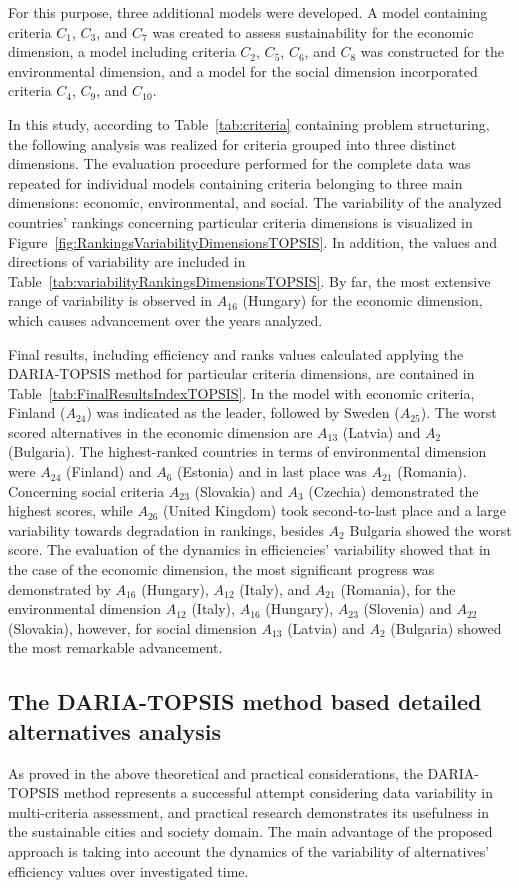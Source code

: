 \documentclass[5p,times]{elsarticle}
\begin{document}
For this purpose, three additional models were developed. A model containing criteria $C_{1}$, $C_{3}$, and $C_{7}$ was created to assess sustainability for the economic dimension, a model including criteria $C_{2}$, $C_{5}$, $C_{6}$, and $C_{8}$ was constructed for the environmental dimension, and a model for the social dimension incorporated criteria $C_{4}$, $C_{9}$, and $C_{10}$.

In this study, according to Table~\ref{tab:criteria} containing problem structuring, the following analysis was realized for criteria grouped into three distinct dimensions. The evaluation procedure performed for the complete data was repeated for individual models containing criteria belonging to three main dimensions: economic, environmental, and social. The variability of the analyzed countries' rankings concerning particular criteria dimensions is visualized in Figure~\ref{fig:RankingsVariabilityDimensionsTOPSIS}. In addition, the values and directions of variability are included in Table~\ref{tab:variabilityRankingsDimensionsTOPSIS}. By far, the most extensive range of variability is observed in $A_{16}$ (Hungary) for the economic dimension, which causes advancement over the years analyzed. 

Final results, including efficiency and ranks values calculated applying the DARIA-TOPSIS method for particular criteria dimensions, are contained in Table~\ref{tab:FinalResultsIndexTOPSIS}. In the model with economic criteria, Finland ($A_{24}$) was indicated as the leader, followed by Sweden ($A_{25}$). The worst scored alternatives in the economic dimension are $A_{13}$ (Latvia) and $A_{2}$ (Bulgaria). The highest-ranked countries in terms of environmental dimension were $A_{24}$ (Finland) and $A_{6}$ (Estonia) and in last place was $A_{21}$ (Romania). Concerning social criteria
$A_{23}$ (Slovakia) and $A_{3}$ (Czechia) demonstrated the highest scores, while $A_{26}$ (United Kingdom) took second-to-last place and a large variability towards degradation in rankings, besides $A_{2}$ Bulgaria showed the worst score. The evaluation of the dynamics in efficiencies' variability showed that in the case of the economic dimension, the most significant progress was demonstrated by $A_{16}$ (Hungary), $A_{12}$ (Italy), and $A_{21}$ (Romania), for the environmental dimension $A_{12}$ (Italy), $A_{16}$ (Hungary), $A_{23}$ (Slovenia) and $A_{22}$ (Slovakia), however, for social dimension $A_{13}$ (Latvia) and $A_{2}$ (Bulgaria) showed the most remarkable advancement.

\subsection{The DARIA-TOPSIS method based detailed alternatives analysis}
\label{sec:resultsDiscussion}
As proved in the above theoretical and practical considerations, the DARIA-TOPSIS method represents a successful attempt considering data variability in multi-criteria assessment, and practical research demonstrates its usefulness in the sustainable cities and society domain. The main advantage of the proposed approach is taking into account the dynamics of the variability of alternatives' efficiency values over investigated time.
\end{document}
